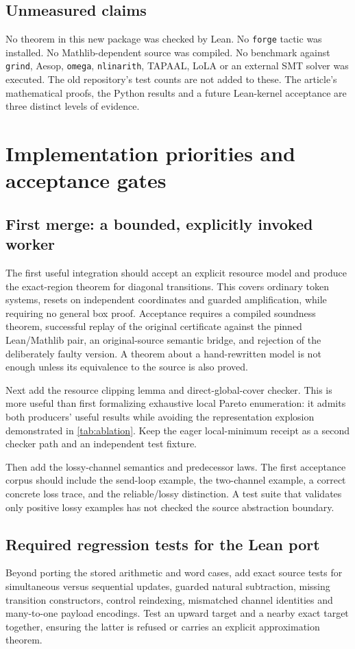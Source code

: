 \documentclass[11pt,a4paper]{article}
\theoremstyle{definition}
\newcommand{\code}[1]{\texttt{#1}}
\begin{document}
\subsection{Unmeasured claims}
No theorem in this new package was checked by Lean. No \code{forge} tactic was
installed. No Mathlib-dependent source was compiled. No benchmark against
\code{grind}, Aesop, \code{omega}, \code{nlinarith}, TAPAAL, LoLA or an external
SMT solver was executed. The old repository's test counts are not added to
these. The article's mathematical proofs, the Python results and a future
Lean-kernel acceptance are three distinct levels of evidence.

\section{Implementation priorities and acceptance gates}
\label{sec:roadmap}

\subsection{First merge: a bounded, explicitly invoked worker}
The first useful integration should accept an explicit resource model and
produce the exact-region theorem for diagonal transitions. This covers
ordinary token systems, resets on independent coordinates and guarded
amplification, while requiring no general box proof. Acceptance requires a
compiled soundness theorem, successful replay of the original certificate
against the pinned Lean/Mathlib pair, an original-source semantic bridge,
and rejection of the deliberately faulty version. A theorem about a
hand-rewritten model is not enough unless its equivalence to the source is
also proved.

Next add the resource clipping lemma and direct-global-cover checker. This
is more useful than first formalizing exhaustive local Pareto enumeration:
it admits both producers' useful results while avoiding the representation
explosion demonstrated in \cref{tab:ablation}. Keep the eager local-minimum
receipt as a second checker path and an independent test fixture.

Then add the lossy-channel semantics and predecessor laws. The first acceptance
corpus should include the send-loop example, the two-channel example, a
correct concrete loss trace, and the reliable/lossy distinction. A test suite
that validates only positive lossy examples has not checked the source
abstraction boundary.

\subsection{Required regression tests for the Lean port}
Beyond porting the stored arithmetic and word cases, add exact source tests
for simultaneous versus sequential updates, guarded natural subtraction,
missing transition constructors, control reindexing, mismatched channel
identities and many-to-one payload encodings. Test an upward target and a
nearby exact target together, ensuring the latter is refused or carries an
explicit approximation theorem.
\end{document}
